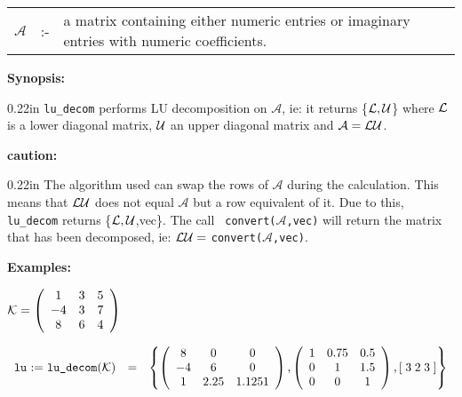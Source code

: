 \hspace*{0.1in} 
\begin{tabular}{l l l}
$\mathcal{A}$ &:-& \parbox[t]{.848\linewidth}{a matrix containing either 
numeric entries or imaginary entries with numeric coefficients.}
\end{tabular}

{\bf Synopsis:} %

\begin{addtolength}{\leftskip}{0.22in}
  {\tt lu\_decom} performs LU decomposition on $\mathcal{A}$, ie: it returns
  \{${\cal L,U}$\} where ${\cal L}$ is a lower diagonal matrix, ${\cal U}$ an
  upper diagonal matrix and $\mathcal{A} = {\cal LU}$.
\end{addtolength}

{\bf caution:}

\begin{addtolength}{\leftskip}{0.22in}
  The algorithm used can swap the rows of $\mathcal{A}$ during the calculation. This
  means that ${\cal LU}$ does not equal $\mathcal{A}$ but a row equivalent of it. Due
  to this, {\tt lu\_decom} returns \{${\cal L,U}$,vec\}. The call {\tt
  convert($\mathcal{A}$,vec)} will return the matrix that has been decomposed, ie:
  ${\cal LU} = $ {\tt convert($\mathcal{A}$,vec)}.
\end{addtolength}

{\bf Examples:}

\begin{flushleft}
\hspace*{0.175in}
\begin{math}  
{\cal K} = \left( \begin{array}{ccc} 1 & 3 & 5 \\ -4 & 3 & 7 \\ 8 & 6 & 
4
\end{array} \right)
\end{math}  
\end{flushleft}

\begin{flushleft}  
\hspace*{0.1in}
\begin{math}  
\begin{array}{cccc}
${\tt lu} := {\tt lu\_decom}$({\cal K}) & = & 
\left\{ 
        \left( \begin{array}{ccc} 8 & 0 & 0 \\ -4 & 6 & 0 \\ 1 & 2.25 & 
1.125 1 \end{array} \right), 
        \left( \begin{array}{ccc} 1 & 0.75 & 0.5 \\ 0 & 1 & 1.5 \\ 0 & 
0 & 1 \end{array} \right), 
	[\; 3 \; 2 \; 3 \; ]
\right\} 
\end{array}
\end{math}  
\end{flushleft}

